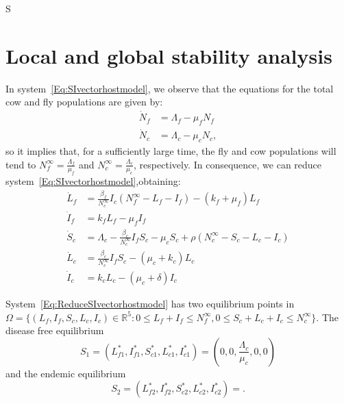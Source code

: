S\documentclass[preprint,12pt]{elsarticle}
\begin{document}
\section{Local and global stability analysis}
\noindent In system~\ref{Eq:SIvectorhostmodel}, we observe that the equations for the total cow and fly populations are given by:
\begin{equation*}
    \begin{aligned}
        \dot{N}_{f} &= \Lambda_{f} - \mu_{f}N_{f}\\
        \dot{N}_{c} &= \Lambda_{c} - \mu_{c}N_{c},
    \end{aligned}
\end{equation*}
so it implies that, for a sufficiently large time, the fly and cow populations will tend to $\displaystyle N_f^{\infty}=\frac{\Lambda_f}{\mu_f}$ and $\displaystyle N_c^{\infty}=\frac{\Lambda_c}{\mu_c}$, respectively. In consequence, we can reduce system~\ref{Eq:SIvectorhostmodel},obtaining:
\begin{equation}\label{Eq:ReduceSIvectorhostmodel}
\begin{aligned}
    \dot{L}_f&= 
        \frac{\beta_f}{N_c^{\infty}}I_c\left(N_f^{\infty} - L_f - I_f\right)-\left(k_f+\mu_f\right)L_f
    \\
    \dot{I}_f&= 
        k_f L_f-\mu_f I_f
    \\
    \dot{S}_c&= 
        \Lambda_c-\frac{\beta_c}{N_c^{\infty}}I_fS_c-\mu_cS_c+\rho \left(N_c^{\infty} - S_c - L_c - I_c\right)
    \\
    \dot{L}_c&= 
        \frac{\beta_c}{N_c^{\infty}}I_fS_c-\left(\mu_c+k_c\right)L_c
    \\
    \dot{I}_c&= k_c L_c-\left(\mu_c +\delta\right)I_c
\end{aligned}
\end{equation}

\noindent System~\ref{Eq:ReduceSIvectorhostmodel} has two equilibrium points in $\Omega = \{\left(L_{f},I_{f},S_{c},L_{c},I_{c}\right)\in \mathbb{R}^{5}: 0\leq L_{f} + I_{f}\leq N_{f}^{\infty}, 0\leq S_{c} + L_{c} + I_{c}\leq N_{c}^{\infty}\}$. The disease free equilibrium 
$$
    S_1 = \left(L_{f1}^*,I_{f1}^*,S_{c1}^*,L_{c1}^*,I_{c1}^*\right) = 
    \left(0,0,\frac{\Lambda_c}{\mu_c},0,0\right)
$$ 
and the endemic equilibrium 
$$
    S_2 = (L_{f2}^*,I_{f2}^*,S_{c2}^*,L_{c2}^*,I_{c2}^*) = 
    .
$$
\end{document}
